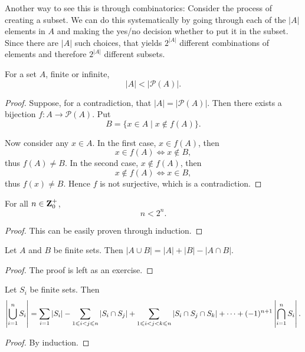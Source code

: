 Another way to see this is through combinatorics: Consider the process of creating a subset. We can do this systematically by going through each of the $|A|$ elements in $A$ and making the yes/no decision whether to put it in the subset. Since there are $|A|$ such choices, that yields $2^{|A|}$ different combinations of elements and therefore $2^{|A|}$ different subsets.

\begin{theorem}\label{thrm:cantor}
For a set $A$, finite or infinite,
\[|A|<|\mathcal{P}(A)|.\]
\end{theorem}

\begin{proof}
Suppose, for a contradiction, that $|A|=|\mathcal{P}(A)|$. Then there exists a bijection $f:A\to\mathcal{P}(A)$. Put
\[B=\{x\in A\mid x\notin f(A)\}.\]

Now consider any $x\in A$. In the first case, $x\in f(A)$, then
\[x\in f(A)\iff x\notin B,\]
thus $f(A)\neq B$. In the second case, $x\notin f(A)$, then 
\[x\notin f(A)\iff x\in B,\]
thus $f(x)\neq B$. Hence $f$ is not surjective, which is a contradiction.
\end{proof}

\begin{corollary}
For all $n\in\mathbf Z_0^+$,
\[n<2^n.\]
\end{corollary}

\begin{proof}
This can be easily proven through induction.
\end{proof}

\begin{proposition}
Let $A$ and $B$ be finite sets. Then $|A \cup B| = |A| + |B| - |A \cap B|$.
\end{proposition}

\begin{proof}
The proof is left as an exercise.
\end{proof}

\begin{theorem}
Let $S_i$ be finite sets. Then
\begin{equation}
\left|\bigcup_{i=1}^nS_i\right|=\sum_{i=1}|S_i|-\sum_{1\leqslant i<j\leqslant n}|S_i\cap S_j|+\sum_{1\leqslant i<j<k\leqslant n}|S_i\cap S_j\cap S_k|+\cdots+(-1)^{n+1}\left|\bigcap_{i=1}^nS_i\right|.
\end{equation}
\end{theorem}

\begin{proof}
By induction.
\end{proof}

